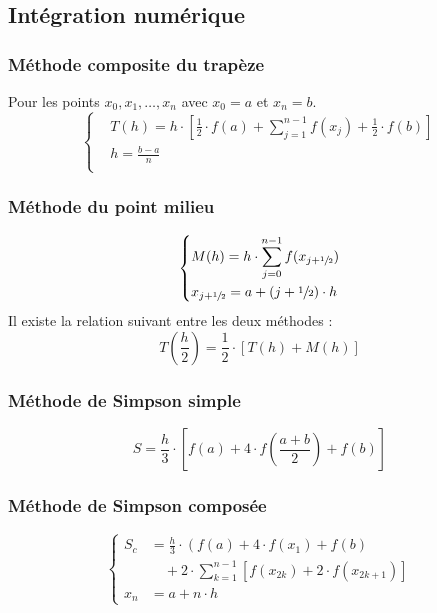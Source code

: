 \subsection*{Intégration numérique}
\subsubsection*{Méthode composite du trapèze}
\noindent
Pour les points $x_0, x_1, \dots, x_n$ avec $x_0=a$ et $x_n=b$.
\begin{equation}
    \left\{
    \begin{aligned}
         & T(h) = h\cdot \left[\frac{1}{2}\cdot f(a)+\sum_{j=1}^{n-1}f(x_j)+\frac{1}{2}\cdot f(b)\right] \\
         & h = \frac{b-a}{n}                                                                             \\
    \end{aligned}
    \right.
    \nonumber
\end{equation}
\subsubsection*{Méthode du point milieu}
\noindent
\begin{equation}
    \left\{
    \begin{aligned}
         & M(h) = h\cdot \sum_{j=0}^{n-1}f(x_{j+\sfrac{1}{2}}) \\
         & x_{j+\sfrac{1}{2}} = a + (j + \sfrac{1}{2})\cdot h
    \end{aligned}
    \right.
    \nonumber
\end{equation}
Il existe la relation suivant entre les deux méthodes :
\begin{equation}
    T\left(\frac{h}{2}\right) = \frac{1}{2}\cdot [T(h) + M(h)]
    \nonumber
\end{equation}
\subsubsection*{Méthode de Simpson simple}
\noindent
\begin{equation}
    S = \frac{h}{3}\cdot \left[f(a)+4\cdot f\left(\frac{a+b}{2}\right)+f(b)\right]
    \nonumber
\end{equation}
\subsubsection*{Méthode de Simpson composée}
\noindent
\begin{equation}
    \left\{
    \begin{aligned}
        S_c & = \frac{h}{3}\cdot \left(f(a)+4\cdot f(x_1)+f(b)\right.     \\
            & \quad+2\cdot \sum_{k=1}^{n-1}[f(x_{2k})+2\cdot f(x_{2k+1})] \\
        x_n & = a + n\cdot h
    \end{aligned}
    \right.
    \nonumber
\end{equation}
